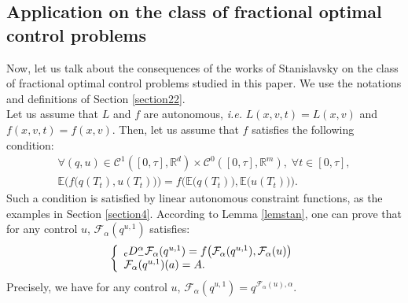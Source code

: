 \documentclass[english,11pt,reqno]{smfart}
\def\ie{\textit{i.e.} }
\newcommand{\R}{\mathbb{R}}
\newcommand{\CC}{\mathscr{C}}
\newcommand{\cDM}{{}_{{\rm c}} D^\alpha_-}
\begin{document}
\subsection{Application on the class of fractional optimal control problems}\label{section32}
Now, let us talk about the consequences of the works of Stanislavsky on the class of fractional optimal control problems studied in this paper. We use the notations and definitions of Section \ref{section22}. \\

Let us assume that $L$ and $f$ are autonomous, \ie $L(x,v,t) = L(x,v)$ and $f(x,v,t) = f(x,v)$. Then, let us assume that $f$ satisfies the following condition:
\begin{multline}\label{condfstan}
\forall (q,u) \in \CC^1 ([0,\tau],\R^d) \times \CC^0 ([0,\tau],\R^m), \; \forall t \in [0,\tau], \\
\mathbb{E}\Big( f \big( q(T_t),u(T_t) \big) \Big) = f \Big( \mathbb{E} \big( q(T_t) \big),\mathbb{E}\big( u(T_t) \big) \Big) .
\end{multline}
Such a condition is satisfied by linear autonomous constraint functions, as the examples in Section \ref{section4}. According to Lemma \ref{lemstan}, one can prove that for any control $u$, $\mathcal{F}_\alpha (q^{u,1})$ satisfies:
\begin{equation}
\left\lbrace \begin{array}{l}
\cDM \mathcal{F}_\alpha (q^{u,1}) = f \big( \mathcal{F}_\alpha (q^{u,1}),\mathcal{F}_\alpha (u) \big) \\
\mathcal{F}_\alpha (q^{u,1}) (a) =A.
\end{array} \right.
\end{equation}
Precisely, we have for any control $u$, $ \mathcal{F}_\alpha (q^{u,1}) = q^{\mathcal{F}_\alpha (u),\alpha} $. \\
\end{document}
